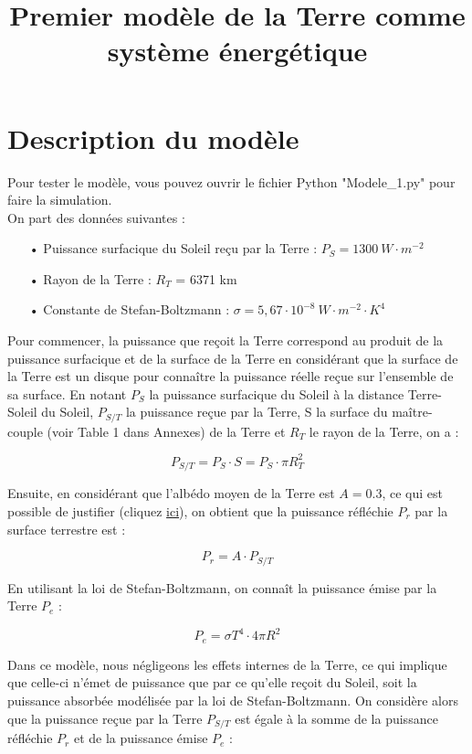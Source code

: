 \documentclass[a4paper,11pt]{article}
\title{Premier modèle de la Terre comme système énergétique}
\begin{document}
\maketitle

\section{Description du modèle}

Pour tester le modèle, vous pouvez ouvrir le fichier Python "Modele\_1.py" pour faire la simulation. \\

On part des données suivantes :

\begin{enumerate}

\item[•] Puissance surfacique du Soleil reçu par la Terre : $P_S = 1300 ~ W \cdot m^{-2}$
\item[•] Rayon de la Terre : $R_T$ = 6371 km
\item[•] Constante de Stefan-Boltzmann : $\sigma = 5,67 \cdot 10^{-8} ~ W \cdot m^{-2} \cdot K^4$ \\

\end{enumerate}

Pour commencer, la puissance que reçoit la Terre correspond au produit de la puissance surfacique et de la surface de la Terre en considérant que la surface de la Terre est un disque pour connaître la puissance réelle reçue sur l'ensemble de sa surface. En notant $P_S$ la puissance surfacique du Soleil à la distance Terre-Soleil du Soleil, $P_{S/T}$ la puissance reçue par la Terre, S la surface du maître-couple (voir Table 1 dans Annexes) de la Terre et $R_T$ le rayon de la Terre, on a :

\[ P_{S/T} = P_S \cdot S = P_S \cdot \pi R_T^2  \]

Ensuite, en considérant que l'albédo moyen de la Terre est $A = 0.3$, ce qui est possible de justifier (cliquez \href{../m/fichier}{ici}), on obtient que la puissance réfléchie $P_r$ par la surface terrestre est :

\[ P_r = A \cdot P_{S/T} \]

En utilisant la loi de Stefan-Boltzmann, on connaît la puissance émise par la Terre $P_e$ :

\[ P_e = \sigma T^4 \cdot 4 \pi R^2 \]

Dans ce modèle, nous négligeons les effets internes de la Terre, ce qui implique que celle-ci n'émet de puissance que par ce qu'elle reçoit du Soleil, soit la puissance absorbée modélisée par la loi de Stefan-Boltzmann. On considère alors que la puissance reçue par la Terre $P_{S/T}$ est égale à la somme de la puissance réfléchie $P_r$ et de la puissance émise $P_e$ :
\end{document}
